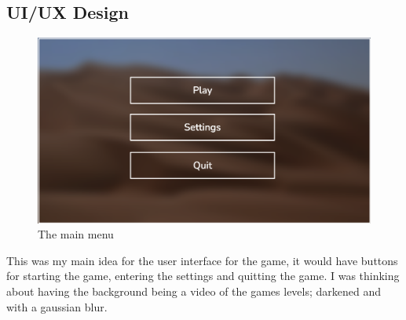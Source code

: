 \documentclass[12pt]{article}
\begin{document}
	\subsection{UI/UX Design}
	\begin{figure}[h]
			\includegraphics[scale=0.3]{mainMenu.png}
			\centering
			\caption{The main menu}
	\end{figure}
	This was my main idea for the user interface for the game, it would have buttons for starting the game, entering the settings and quitting the game. I was thinking about having the background being a video of the games levels; darkened and with a gaussian blur.
	
\end{document}
